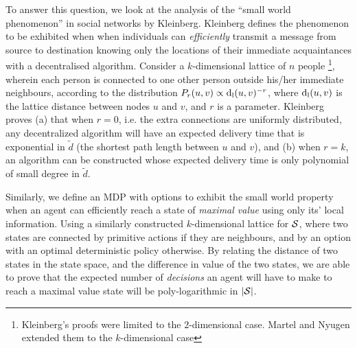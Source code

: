 \label{sec:approach}

To answer this question, we look at the analysis of the ``small world
phenomenon'' in social networks by Kleinberg. Kleinberg defines the phenomenon
to be exhibited when when individuals can {\em efficiently} transmit a message
from source to destination knowing only the locations of their immediate
acquaintances with a decentralised algorithm. 
Consider a $k$-dimensional lattice of $n$ people \footnote{ Kleinberg's proofs
were limited to the $2$-dimensional case. Martel and Nyugen \cite{Martel2004}
extended them to the $k$-dimensional case }, wherein each person is connected to
one other person outside his/her immediate neighbours, according to the
distribution $P_{r}( u, v ) \propto \operatorname{d_l}(u,v)^{-r}$, where $\operatorname{d_l}(u,v)$
is the lattice distance between nodes $u$ and $v$, and $r$ is a parameter.
Kleinberg proves (a) that when $r=0$, i.e. the extra connections are uniformly
distributed, any decentralized algorithm will have an expected delivery time
that is exponential in $\tilde{d}$ (the shortest path length between $u$ and
$v$), and (b) when $r=k$, an algorithm can be constructed whose expected
delivery time is only polynomial of small degree in $\tilde{d}$.

Similarly, we define an MDP with options to exhibit the small world property
when an agent can efficiently reach a state of {\em maximal value} using only
its' local information. Using a similarly constructed $k$-dimensional lattice
for $\mathcal{S}$, where two states are connected by primitive actions if they are
neighbours, and by an option with an optimal deterministic policy otherwise. By
relating the distance of two states in the state space, and the difference in
value of the two states, we are able to prove that the expected number of {\em
decisions} an agent will have to make to reach a maximal value state will be poly-logarithmic in
$|\mathcal{S}|$.
